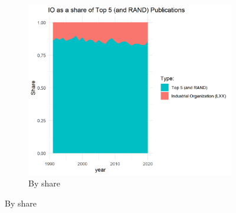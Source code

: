 \documentclass[11pt, letterpaper, twoside]{article}
\begin{document}
\begin{figure}[h]
\begin{subfigure}[h]{0.49\textwidth}
        \includegraphics[width=\textwidth]{LXX-code-share-area-normalized.png}
        \caption*{By share}
    \end{subfigure}
\end{figure}
\end{document}
